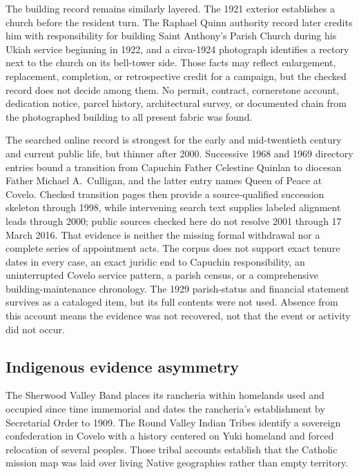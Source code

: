 The building record remains similarly layered. The 1921 exterior establishes a church before the resident turn. The Raphael Quinn authority record later credits him with responsibility for building Saint Anthony's Parish Church during his Ukiah service beginning in 1922, and a circa-1924 photograph identifies a rectory next to the church on its bell-tower side. Those facts may reflect enlargement, replacement, completion, or retrospective credit for a campaign, but the checked record does not decide among them. No permit, contract, cornerstone account, dedication notice, parcel history, architectural survey, or documented chain from the photographed building to all present fabric was found.

The searched online record is strongest for the early and mid-twentieth century and current public life, but thinner after 2000. Successive 1968 and 1969 directory entries bound a transition from Capuchin Father Celestine Quinlan to diocesan Father Michael A.~Culligan, and the latter entry names Queen of Peace at Covelo. Checked transition pages then provide a source-qualified succession skeleton through 1998, while intervening search text supplies labeled alignment leads through 2000; public sources checked here do not resolve 2001 through 17 March 2016. That evidence is neither the missing formal withdrawal nor a complete series of appointment acts. The corpus does not support exact tenure dates in every case, an exact juridic end to Capuchin responsibility, an uninterrupted Covelo service pattern, a parish census, or a comprehensive building-maintenance chronology. The 1929 parish-status and financial statement survives as a cataloged item, but its full contents were not used. Absence from this account means the evidence was not recovered, not that the event or activity did not occur.

\subsection{Indigenous evidence asymmetry}

The Sherwood Valley Band places its rancheria within homelands used and occupied since time immemorial and dates the rancheria's establishment by Secretarial Order to 1909. The Round Valley Indian Tribes identify a sovereign confederation in Covelo with a history centered on Yuki homeland and forced relocation of several peoples. Those tribal accounts establish that the Catholic mission map was laid over living Native geographies rather than empty territory.

